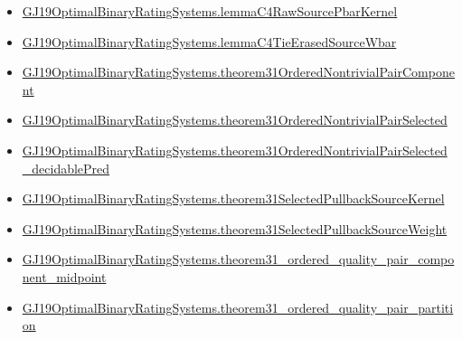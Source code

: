 \documentclass[10pt]{article}
\begin{document}
\begin{itemize}
\item \hyperlink{governing-declaration-a9213a3ac1f82188}{GJ19\allowbreak{}Optimal\allowbreak{}Binary\allowbreak{}Rating\allowbreak{}Systems.\allowbreak{}lemma\allowbreak{}C4\allowbreak{}Raw\allowbreak{}Source\allowbreak{}Pbar\allowbreak{}Kernel}
\item \hyperlink{governing-declaration-024d06f8b7e61292}{GJ19\allowbreak{}Optimal\allowbreak{}Binary\allowbreak{}Rating\allowbreak{}Systems.\allowbreak{}lemma\allowbreak{}C4\allowbreak{}Tie\allowbreak{}Erased\allowbreak{}Source\allowbreak{}Wbar}
\item \hyperlink{governing-declaration-34d8b48d5e8dca9d}{GJ19\allowbreak{}Optimal\allowbreak{}Binary\allowbreak{}Rating\allowbreak{}Systems.\allowbreak{}theorem31\allowbreak{}Ordered\allowbreak{}Nontrivial\allowbreak{}Pair\allowbreak{}Component}
\item \hyperlink{governing-declaration-4acc8d4998a6337a}{GJ19\allowbreak{}Optimal\allowbreak{}Binary\allowbreak{}Rating\allowbreak{}Systems.\allowbreak{}theorem31\allowbreak{}Ordered\allowbreak{}Nontrivial\allowbreak{}Pair\allowbreak{}Selected}
\item \hyperlink{governing-declaration-d76d2d57b804b198}{GJ19\allowbreak{}Optimal\allowbreak{}Binary\allowbreak{}Rating\allowbreak{}Systems.\allowbreak{}theorem31\allowbreak{}Ordered\allowbreak{}Nontrivial\allowbreak{}Pair\allowbreak{}Selected\_\allowbreak{}decidable\allowbreak{}Pred}
\item \hyperlink{governing-declaration-6524ebb23effa916}{GJ19\allowbreak{}Optimal\allowbreak{}Binary\allowbreak{}Rating\allowbreak{}Systems.\allowbreak{}theorem31\allowbreak{}Selected\allowbreak{}Pullback\allowbreak{}Source\allowbreak{}Kernel}
\item \hyperlink{governing-declaration-f8d44d837874f987}{GJ19\allowbreak{}Optimal\allowbreak{}Binary\allowbreak{}Rating\allowbreak{}Systems.\allowbreak{}theorem31\allowbreak{}Selected\allowbreak{}Pullback\allowbreak{}Source\allowbreak{}Weight}
\item \hyperlink{governing-declaration-220d22a7d24c7696}{GJ19\allowbreak{}Optimal\allowbreak{}Binary\allowbreak{}Rating\allowbreak{}Systems.\allowbreak{}theorem31\_\allowbreak{}ordered\_\allowbreak{}quality\_\allowbreak{}pair\_\allowbreak{}component\_\allowbreak{}midpoint}
\item \hyperlink{governing-declaration-133b07b669b99331}{GJ19\allowbreak{}Optimal\allowbreak{}Binary\allowbreak{}Rating\allowbreak{}Systems.\allowbreak{}theorem31\_\allowbreak{}ordered\_\allowbreak{}quality\_\allowbreak{}pair\_\allowbreak{}partition}
\end{itemize}
\end{document}

